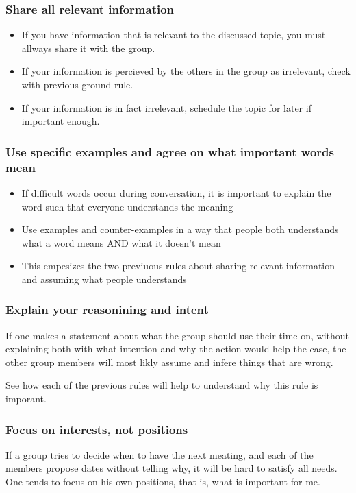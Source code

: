 \documentclass[screen]{beamer}
\begin{document}
\begin{frame}
    \frametitle{Share all relevant information}

    \begin{itemize}
        \item If you have information that is relevant to the discussed topic, you must allways share it with the group.
        \item If your information is percieved by the others in the group as irrelevant, check with previous ground rule.
        \item If your information is in fact irrelevant, schedule the topic for later if important enough.
    \end{itemize}

\end{frame}

\begin{frame}
    \frametitle{Use specific examples and agree on what important words mean}

    \begin{itemize}
        \item If difficult words occur during conversation, it is important to explain the word such that everyone understands the meaning
        \item Use examples and counter-examples in a way that people both understands what a word means AND what it doesn't mean
        \item This empesizes the two previuous rules about sharing relevant information and assuming what people understands
    \end{itemize}

\end{frame}
\begin{frame}
    \frametitle{Explain your reasonining and intent}
    
    If one makes a statement about what the group should use their time on, without explaining both with what intention and why the action
    would help the case, the other group members will most likly assume and infere things that are wrong.

See how each of the previous rules
    will help to understand why this rule is imporant.

\end{frame}
\begin{frame}
    \frametitle{Focus on interests, not positions}

        If a group tries to decide when to have the next meating, and each of the members propose dates without telling
        why, it will be hard to satisfy all needs. One tends to focus on his own positions, that is, what is important for me.
\end{frame}
\end{document}
